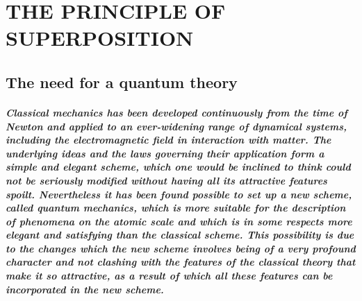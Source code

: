 \documentclass[10pt, kindle, oneside]{kindle}
\begin{document}
\maketitle
	
\chapter{THE PRINCIPLE OF SUPERPOSITION}

\section{The need for a quantum theory}
\paragraph{Classical mechanics has been developed continuously from the time of Newton and applied to an ever-widening range of dynamical systems, including the electromagnetic field in interaction with matter. The underlying ideas and the laws governing their application form a simple and elegant scheme, which one would be inclined to think could not be seriously modified without having all its attractive features spoilt. Nevertheless it has been found possible to set up a new scheme, called quantum mechanics, which is more suitable for the description of phenomena on the atomic scale and which is in some respects more elegant and satisfying than the classical scheme. This possibility is due to the changes which the new scheme involves being of a very profound character and not clashing with the features of the classical theory that make it so attractive, as a result of which all these features can be incorporated in the new scheme.}
\end{document}
